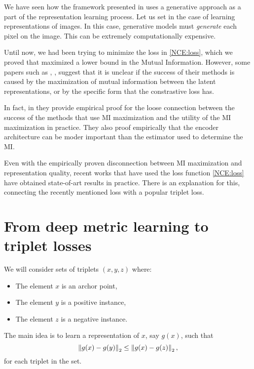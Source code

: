 
We have seen how the framework presented in \cite{oord_et_al} uses a generative approach as a part of the representation learning process. Let us set in the case of learning representations of images. In this case, generative models must \emph{generate} each pixel on the image. This can be extremely computationally expensive. 

Until now, we had been trying to minimize the loss in \ref{NCE:loss}, which we proved that maximized a lower bound in the Mutual Information. However, some papers such as \cite{chen_simple_2020}, \cite{tschannen_mutual_2020}, suggest that it is unclear if the success of their methods is caused by the maximization of mutual information between the latent representations, or by the specific form that the constrastive loss has.

In fact, in \cite{tschannen_mutual_2020} they provide empirical proof for the loose connection between the success of the methods that use MI maximization and the utility of the MI maximization in practice. They also proof empirically that the encoder architecture can be moder important than the estimator used to determine the MI.

Even with the empirically proven disconnection between MI maximization and representation quality, recent works that have used the loss function \ref{NCE:loss} have obtained state-of-art results in practice. There is an explanation for this, connecting the recently mentioned loss with a popular triplet loss.

\section{From deep metric learning to triplet losses}

We will consider sets of triplets $(x,y,z)$ where:
\begin{itemize}
\item The element $x$ is an archor point,
\item The element $y$ is a positive instance,
\item The element $z$ is a negative instance.
\end{itemize}
The main idea is to learn a representation of $x$, say $g(x)$, such that 
$$
\left\lVert g(x) - g(y)\right\rVert_2 \leq \left\lVert g(x) - g(z)\right\rVert_2,
$$
for each triplet in the set.